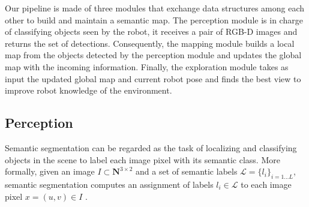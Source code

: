 \documentclass{article}
\begin{document}
	Our pipeline is made of three modules that exchange data structures among each other to build and maintain a semantic map. The perception module is in charge of classifying objects seen by the robot, it receives a pair of RGB-D images and returns the set of detections. Consequently, the mapping module builds a local map from the objects detected by the perception module and updates the global map with the incoming information. Finally, the exploration module takes as input the updated global map and current robot pose and finds the best view to improve robot knowledge of the environment.
	
	\subsection{Perception}
	
%	
	
	Semantic segmentation can be regarded as the task of localizing and classifying objects in the scene to label each image pixel with its semantic class.
	More formally, given an image $I \subset \mathbf{N}^{3 \times 2}$ and a set of semantic labels $\mathcal{L} = \{l_i\}_{i=1 \dots L}$, semantic segmentation computes an assignment of labels $l_i \in \mathcal{L}$ to each image pixel $x = (u,v) \in I$ .
	
\end{document}
